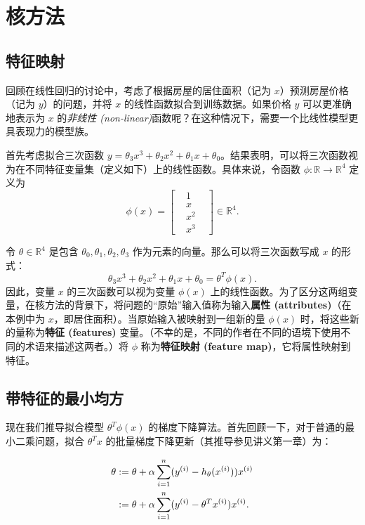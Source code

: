 \chapter{核方法}

\section{特征映射}

回顾在线性回归的讨论中，考虑了根据房屋的居住面积（记为 $x$）预测房屋价格（记为 $y$）的问题，并将 $x$ 的线性函数拟合到训练数据。如果价格 $y$ 可以更准确地表示为 $x$ 的\textit{非线性 (non-linear)}函数呢？在这种情况下，需要一个比线性模型更具表现力的模型族。

首先考虑拟合三次函数 $y = \theta_3 x^3 + \theta_2 x^2 + \theta_1 x + \theta_0$。结果表明，可以将三次函数视为在不同特征变量集（定义如下）上的线性函数。具体来说，令函数 $\phi: \mathbb{R} \to \mathbb{R}^4$ 定义为
\begin{equation}
    \phi(x) = \begin{bmatrix} &1& \\ &x& \\ &x^2& \\ &x^3& \end{bmatrix} \in \mathbb{R}^4.
    \label{eq:kernel_phi}
\end{equation}

令 $\theta \in \mathbb{R}^4$ 是包含 $\theta_0, \theta_1, \theta_2, \theta_3$ 作为元素的向量。那么可以将三次函数写成 $x$ 的形式：
\[
    \theta_3 x^3 + \theta_2 x^2 + \theta_1 x + \theta_0 = \theta^T \phi(x).
\]
因此，变量 $x$ 的三次函数可以视为变量 $\phi(x)$ 上的线性函数。为了区分这两组变量，在核方法的背景下，将问题的“原始”输入值称为输入\textbf{属性 (attributes)}（在本例中为 $x$，即居住面积）。当原始输入被映射到一组新的量 $\phi(x)$ 时，将这些新的量称为\textbf{特征 (features)} 变量。（不幸的是，不同的作者在不同的语境下使用不同的术语来描述这两者。）将 $\phi$ 称为\textbf{特征映射 (feature map)}，它将属性映射到特征。

\section{带特征的最小均方}

现在我们推导拟合模型 $\theta^T \phi(x)$ 的梯度下降算法。首先回顾一下，对于普通的最小二乘问题，拟合 $\theta^T x$ 的批量梯度下降更新（其推导参见讲义第一章）为：

\begin{align} 
    \theta &:= \theta + \alpha \sum_{i=1}^n (y^{(i)} - h_\theta(x^{(i)})) x^{(i)} \notag\\ 
    &:= \theta + \alpha \sum_{i=1}^n (y^{(i)} - \theta^T x^{(i)}) x^{(i)}.\label{eq:kernel_ols}
\end{align}

